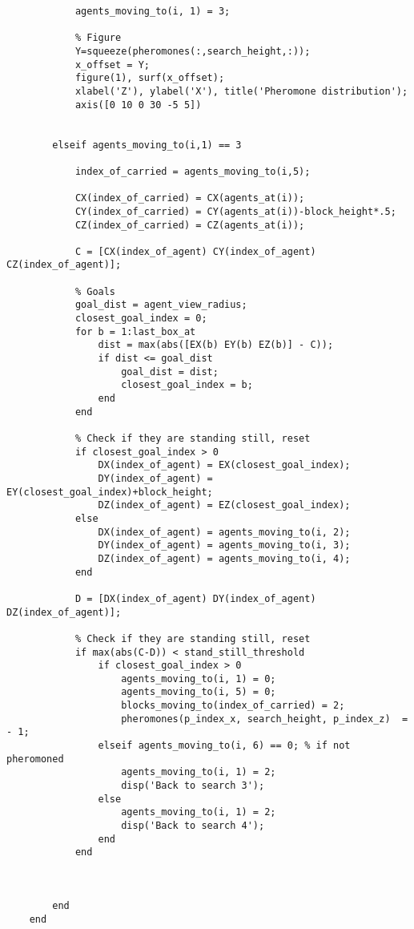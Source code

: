 \begin{lstlisting}
            agents_moving_to(i, 1) = 3;
            
            % Figure
            Y=squeeze(pheromones(:,search_height,:));
            x_offset = Y;
            figure(1), surf(x_offset);
            xlabel('Z'), ylabel('X'), title('Pheromone distribution');
            axis([0 10 0 30 -5 5])

            
        elseif agents_moving_to(i,1) == 3
            
            index_of_carried = agents_moving_to(i,5);
            
            CX(index_of_carried) = CX(agents_at(i));
            CY(index_of_carried) = CY(agents_at(i))-block_height*.5;
            CZ(index_of_carried) = CZ(agents_at(i));
            
            C = [CX(index_of_agent) CY(index_of_agent) CZ(index_of_agent)];
            
            % Goals
            goal_dist = agent_view_radius;
            closest_goal_index = 0;
            for b = 1:last_box_at 
                dist = max(abs([EX(b) EY(b) EZ(b)] - C));
                if dist <= goal_dist
                    goal_dist = dist;
                    closest_goal_index = b;
                end
            end
            
            % Check if they are standing still, reset
            if closest_goal_index > 0
                DX(index_of_agent) = EX(closest_goal_index);
                DY(index_of_agent) = EY(closest_goal_index)+block_height;
                DZ(index_of_agent) = EZ(closest_goal_index);
            else
                DX(index_of_agent) = agents_moving_to(i, 2);
                DY(index_of_agent) = agents_moving_to(i, 3);
                DZ(index_of_agent) = agents_moving_to(i, 4);
            end
          
            D = [DX(index_of_agent) DY(index_of_agent) DZ(index_of_agent)];
            
            % Check if they are standing still, reset
            if max(abs(C-D)) < stand_still_threshold                
                if closest_goal_index > 0
                    agents_moving_to(i, 1) = 0;
                    agents_moving_to(i, 5) = 0;
                    blocks_moving_to(index_of_carried) = 2;
                    pheromones(p_index_x, search_height, p_index_z)  = - 1;  
                elseif agents_moving_to(i, 6) == 0; % if not pheromoned
                    agents_moving_to(i, 1) = 2;
                    disp('Back to search 3');
                else
                    agents_moving_to(i, 1) = 2;
                    disp('Back to search 4');
                end
            end
            
  
            
        end
    end


\end{lstlisting}